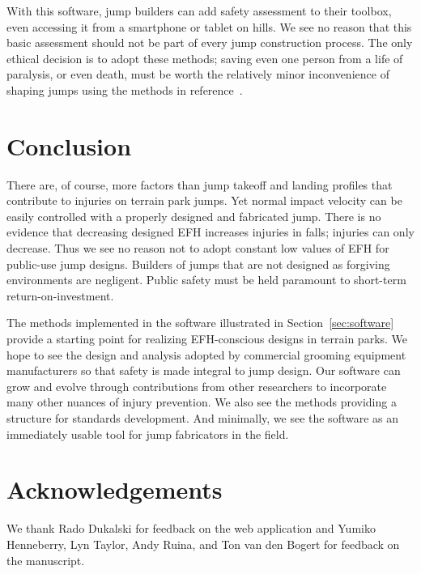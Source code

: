 \documentclass{article}
\begin{document}
With this software, jump builders can add safety assessment to their
toolbox, even accessing it from a smartphone or tablet on hills.  We see no
reason that this basic assessment should not be part of every jump construction
process. The only ethical decision is to adopt these methods; saving even one
person from a life of paralysis, or even death, must be worth the relatively
minor inconvenience of shaping jumps using the methods in
reference~\cite{Levy2015}.

\section{Conclusion}
\label{sec:conc}
%
There are, of course, more factors than jump takeoff and landing profiles
that contribute to injuries on terrain park jumps. Yet normal impact velocity
can be easily controlled with a properly designed and fabricated jump. There is no evidence that decreasing designed EFH increases
injuries in falls; injuries can only decrease. Thus we see no reason not to adopt
constant low values of EFH for public-use jump designs. Builders of jumps
that are not designed as forgiving environments are negligent. Public safety
must be held paramount to short-term return-on-investment.

The methods implemented in the software illustrated in
Section~\ref{sec:software} provide a starting point for realizing EFH-conscious
designs in terrain parks. We hope to see the design and analysis adopted by
commercial grooming equipment manufacturers so that safety is made integral to
jump design. Our software can grow and evolve through contributions from other
researchers to incorporate many other nuances of injury prevention. We also see
the methods providing a structure for standards development. And minimally, we
see the software as an immediately usable tool for jump fabricators in the
field.

\section*{Acknowledgements}
We thank Rado Dukalski for feedback on the web application and Yumiko
Henneberry, Lyn Taylor, Andy Ruina, and Ton van den Bogert for feedback on the manuscript.
\end{document}
